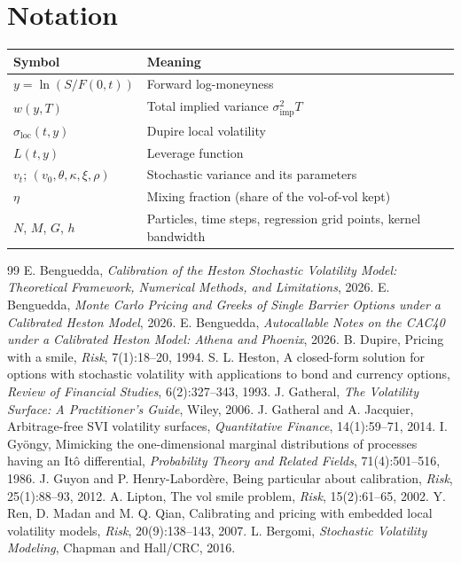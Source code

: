 \documentclass[11pt,a4paper]{article}
\newcommand{\sloc}{\sigma_{\mathrm{loc}}}
\begin{document}
\section{Notation}
\begin{center}
\begin{tabular}{@{}ll@{}}
\toprule
Symbol & Meaning \\
\midrule
$y = \ln(S/F(0,t))$ & Forward log-moneyness \\
$w(y, T)$ & Total implied variance $\sigma_{\mathrm{imp}}^2 T$ \\
$\sloc(t, y)$ & Dupire local volatility \\
$L(t, y)$ & Leverage function \\
$v_t$; $(v_0, \theta, \kappa, \xi, \rho)$ & Stochastic variance and its parameters \\
$\eta$ & Mixing fraction (share of the vol-of-vol kept) \\
$N$, $M$, $G$, $h$ & Particles, time steps, regression grid points, kernel bandwidth \\
\bottomrule
\end{tabular}
\end{center}

\begin{thebibliography}{99}
 E. Benguedda, \emph{Calibration of the Heston Stochastic Volatility Model: Theoretical
Framework, Numerical Methods, and Limitations}, 2026.
 E. Benguedda, \emph{Monte Carlo Pricing and Greeks of Single Barrier Options under a
Calibrated Heston Model}, 2026.
 E. Benguedda, \emph{Autocallable Notes on the CAC40 under a Calibrated Heston Model:
Athena and Phoenix}, 2026.
 B. Dupire, Pricing with a smile, \emph{Risk}, 7(1):18--20, 1994.
 S. L. Heston, A closed-form solution for options with stochastic volatility with applications
to bond and currency options, \emph{Review of Financial Studies}, 6(2):327--343, 1993.
 J. Gatheral, \emph{The Volatility Surface: A Practitioner's Guide}, Wiley, 2006.
 J. Gatheral and A. Jacquier, Arbitrage-free SVI volatility surfaces, \emph{Quantitative
Finance}, 14(1):59--71, 2014.
 I. Gyöngy, Mimicking the one-dimensional marginal distributions of processes having an Itô
differential, \emph{Probability Theory and Related Fields}, 71(4):501--516, 1986.
 J. Guyon and P. Henry-Labordère, Being particular about calibration, \emph{Risk}, 25(1):88--93,
2012.
 A. Lipton, The vol smile problem, \emph{Risk}, 15(2):61--65, 2002.
 Y. Ren, D. Madan and M. Q. Qian, Calibrating and pricing with embedded local volatility models,
\emph{Risk}, 20(9):138--143, 2007.
 L. Bergomi, \emph{Stochastic Volatility Modeling}, Chapman and Hall/CRC, 2016.
\end{thebibliography}
\end{document}
